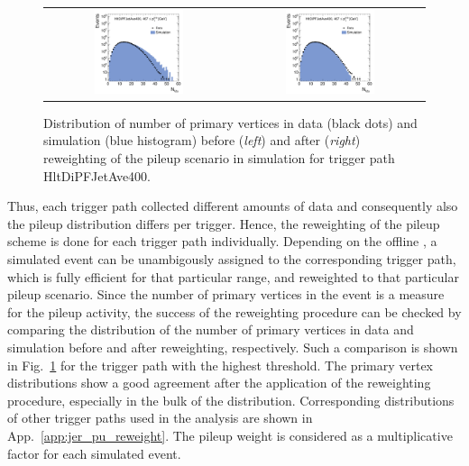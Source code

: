 \begin{figure}[!t]
  \centering
  \begin{tabular}{cc}
                \includegraphics[width=0.49\textwidth]{figures/NVtx_HltDiPFJetAve400_AfterTriggerSelection.pdf} &
                \includegraphics[width=0.49\textwidth]{figures/NVtx_HltDiPFJetAve400_AfterPUReweighting.pdf}
  \end{tabular}
  \caption{Distribution of number of primary vertices in data (black dots) and simulation (blue histogram) before (\textit{left}) and after (\textit{right}) reweighting of the pileup scenario in simulation for trigger path HltDiPFJetAve400.}
  \label{fig:pu_reweight}
\end{figure}
Thus, each trigger path collected different amounts of data and consequently also the pileup distribution differs per trigger. Hence, the reweighting of the pileup scheme is done for each trigger path individually. Depending on the offline \ptave, a simulated event can be unambigously assigned to the corresponding trigger path, which is fully efficient for that particular \pt range, and reweighted to that particular pileup scenario. Since the number of primary vertices in the event is a measure for the pileup activity, the success of the reweighting procedure can be checked by comparing the distribution of the number of primary vertices in data and simulation before and after reweighting, respectively. Such a comparison is shown in Fig.~\ref{fig:pu_reweight} for the trigger path with the highest \ptave threshold. The primary vertex distributions show a good agreement after the application of the reweighting procedure, especially in the bulk of the distribution. Corresponding distributions of other trigger paths used in the analysis are shown in App.~\ref{app:jer_pu_reweight}. The pileup weight is considered as a multiplicative factor for each simulated event. \\
